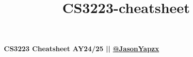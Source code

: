 \documentclass[10pt,landscape]{article}
\title{CS3223-cheatsheet}
\makeatletter
\renewcommand{\subsection}{\@startsection{subsection}{2}{0mm}%
                                {-1explus -.5ex minus -.2ex}%
                                {0.5ex plus .2ex}%
                                {\normalfont\normalsize\bfseries}}
\renewcommand{\subsubsection}{\@startsection{subsubsection}{3}{0mm}%
                                {-1ex plus -.5ex minus -.2ex}%
                                {1ex plus .2ex}%
                                {\normalfont\small\bfseries}}
\newcommand{\subsubsubsection}{\@startsection{subsubsection}{3}{0mm}%
                                {-1ex plus -.5ex minus -.2ex}%
                                {1ex plus .2ex}%
                                {\normalfont\scriptsize\bfseries}}
\newcommand{\1}{\mathmybb{1}}
\makeatother
\begin{document}
\raggedright
\scriptsize

\begin{multicols*}{3}
\setlength{\premulticols}{0.1pt}
\setlength{\postmulticols}{0.1pt}
\setlength{\multicolsep}{0.1pt}
\setlength{\columnsep}{0.1pt}
\begin{tiny}
    \small{\textbf{CS3223 Cheatsheet AY24/25 || \href{https://github.com/JasonYapzx}{@JasonYapzx}}} \\
\end{tiny}


    





\end{multicols*}
\end{document}
